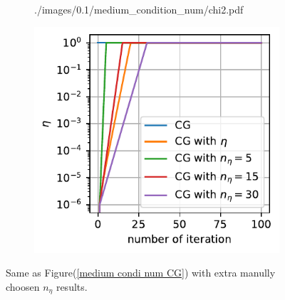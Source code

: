 \documentclass[11pt, letterpaper]{article}
\begin{document}
\begin{figure}[htb]
\begin{subfigure}{0.33\textwidth}
        {./images/0.1/medium_condition_num/chi2.pdf}
    \caption{}
    \label{medium condi num chi2}
\end{subfigure}%
\begin{subfigure}{0.33\textwidth}
    \centering
    \includegraphics[width=\linewidth]
        {./images/0.1/medium_condition_num/eta.pdf}
    \caption{}
    \label{medium condi num eta}
\end{subfigure}
\caption{Same as Figure(\ref{medium condi num CG}) with extra manully choosen 
    $n_{\eta}$ results.
}
\label{medium condi num}
\end{figure}
\end{document}
